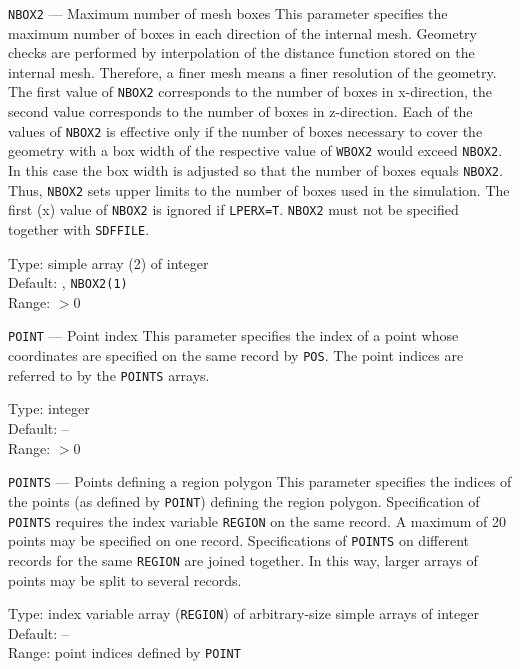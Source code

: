 \begin{keydescription}{\texttt{NBOX2} --- Maximum number of mesh boxes}
%
  This parameter specifies the maximum number of boxes in each direction 
  of the internal mesh. Geometry checks are performed by interpolation of the 
  distance function stored on the internal mesh. Therefore, a finer mesh means 
  a finer resolution of the geometry. The first value of \texttt{NBOX2} 
  corresponds to the number of boxes in x-direction, the second value 
  corresponds to the number of boxes in z-direction. Each of the values of 
  \texttt{NBOX2} is effective only if the number of boxes necessary to cover 
  the geometry with a box width of the respective value of \texttt{WBOX2} 
  would exceed \texttt{NBOX2}. In this case the box width is adjusted so that 
  the number of boxes equals \texttt{NBOX2}. Thus, \texttt{NBOX2} sets upper 
  limits to the number of boxes used in the simulation. The first (x) value of 
  \texttt{NBOX2} is ignored if \texttt{LPERX=T}.  \texttt{NBOX2} must not be 
  specified together with \texttt{SDFFILE}.
  \begin{keytab}
    Type:    \> simple array (2) of integer \\
    Default: , \texttt{NBOX2(1)} \\
    Range:   \> $> 0$
  \end{keytab}
\end{keydescription}

\begin{keydescription}{\texttt{POINT} --- Point index}
%
  This parameter specifies the index of a point whose coordinates are specified
  on the same record by \texttt{POS}. The point indices are referred to by the
  \texttt{POINTS} arrays. 
  \begin{keytab}
    Type:    \> integer \\
    Default: \> -- \\
    Range:   \> $>0$ 
  \end{keytab}
\end{keydescription}

\begin{keydescription}{\texttt{POINTS} --- Points defining a region polygon}
%
  This parameter specifies the indices of the points (as defined by
  \texttt{POINT}) defining the region polygon.  Specification of
  \texttt{POINTS} requires the index variable \texttt{REGION} on the same
  record. A maximum of 20 points may be specified on one record.
  Specifications of \texttt{POINTS} on different records for the same
  \texttt{REGION} are joined together.  In this way, larger arrays of points 
  may be split to several records.  
  \begin{keytab}
    Type:    \> index variable array (\texttt{REGION}) of arbitrary-size 
    simple arrays of integer \\
    Default: \> -- \\
    Range:   \> point indices defined by \texttt{POINT} 
  \end{keytab}
\end{keydescription}

